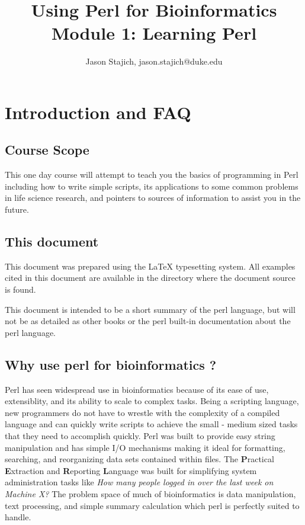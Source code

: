 \documentclass{article}
\begin{document}
\begin{titlepage}

\title{Using Perl for Bioinformatics\\ Module 1: Learning Perl}
\author{Jason Stajich, jason.stajich@duke.edu}

\end{titlepage}
\maketitle

\newpage

\tableofcontents
\newpage
\setcounter{page}{0}
\section{Introduction and FAQ}
\subsection{Course Scope}

This one day course will attempt to teach you the basics of
programming in Perl including how to write simple scripts,
its applications to some common problems in life science research, and
pointers to sources of information to assist you in the future. 

\subsection{This document}
This document was prepared using the LaTeX typesetting system.  All
examples cited in this document are available in the directory where
the document source is found.
\par
This document is intended to be a short summary of the perl language,
but will not be as detailed as other books or the perl built-in
documentation about the perl language.

\subsection{Why use perl for bioinformatics ?}

Perl has seen widespread use in bioinformatics because of its ease of
use, extensiblity, and its ability to scale to complex tasks.  Being a
scripting language, new programmers do not have to wrestle with the
complexity of a compiled language and can quickly write scripts to
achieve the small - medium sized tasks that they need to accomplish
quickly.  Perl was built to provide easy string manipulation and has
simple I/O mechanisms making it ideal for formatting, searching, and
reorganizing data sets contained within files.  The {\bf P}ractical
{\bf E}xtraction and {\bf R}eporting {\bf L}anguage was built for
simplifying system administration tasks like {\it How many people
logged in over the last week on Machine X?}  The problem space of much
of bioinformatics is data manipulation, text processing, and simple
summary calculation which perl is perfectly suited to handle.
\end{document}
